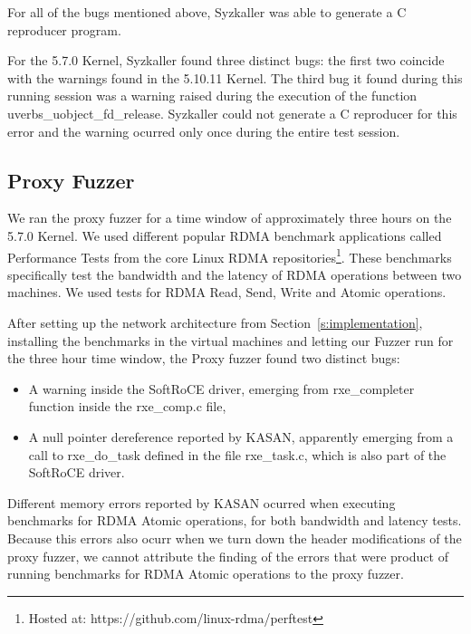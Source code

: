 For all of the bugs mentioned above, Syzkaller was able to generate a C reproducer program.

For the 5.7.0 Kernel, Syzkaller found three distinct bugs: the first two coincide with the warnings found in the 5.10.11 Kernel.
The third bug it found during this running session was a warning raised during the execution of the function uverbs\_uobject\_fd\_release.
Syzkaller could not generate a C reproducer for this error and the warning ocurred only once during the entire test session.

\subsection{Proxy Fuzzer}

We ran the proxy fuzzer for a time window of approximately three hours on the 5.7.0 Kernel.
We used different popular RDMA benchmark applications called Performance Tests from the core
Linux RDMA repositories\footnote{Hosted at: https://github.com/linux-rdma/perftest}. These benchmarks
specifically test the bandwidth and the latency of RDMA operations between two machines.
We used tests for RDMA Read, Send, Write and Atomic operations.


After setting up the network architecture from Section~\ref{s:implementation}, installing the benchmarks in the
virtual machines and letting our Fuzzer run for the three hour time window, the Proxy fuzzer found two distinct bugs:

\begin{itemize}
  \item A warning inside the SoftRoCE driver, emerging from rxe\_completer function inside the rxe\_comp.c file,
  \item A null pointer dereference reported by KASAN, apparently emerging from a call to rxe\_do\_task defined in the file rxe\_task.c, which is also part of the SoftRoCE driver.
\end{itemize}

Different memory errors reported by KASAN ocurred when executing benchmarks
for RDMA Atomic operations, for both bandwidth and latency tests.
Because this errors also ocurr when we turn down the header modifications
of the proxy fuzzer, we cannot attribute the finding of the errors that
were product of running benchmarks for RDMA Atomic operations to the proxy fuzzer.
